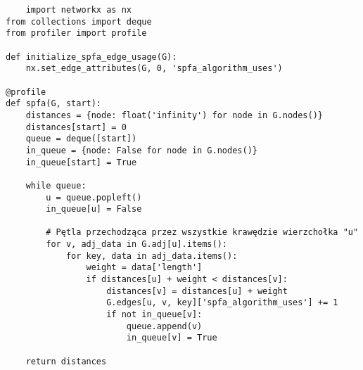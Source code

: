 \documentclass{article}
\begin{document}
\lstset{language=Pascal}          %

\begin{lstlisting}
    import networkx as nx
from collections import deque
from profiler import profile

def initialize_spfa_edge_usage(G):
    nx.set_edge_attributes(G, 0, 'spfa_algorithm_uses')

@profile
def spfa(G, start):
    distances = {node: float('infinity') for node in G.nodes()}
    distances[start] = 0
    queue = deque([start])
    in_queue = {node: False for node in G.nodes()}
    in_queue[start] = True

    while queue:
        u = queue.popleft()
        in_queue[u] = False
        
        # Pętla przechodząca przez wszystkie krawędzie wierzchołka "u"
        for v, adj_data in G.adj[u].items():
            for key, data in adj_data.items():
                weight = data['length']
                if distances[u] + weight < distances[v]:
                    distances[v] = distances[u] + weight
                    G.edges[u, v, key]['spfa_algorithm_uses'] += 1
                    if not in_queue[v]:
                        queue.append(v)
                        in_queue[v] = True

    return distances
    
    
    
\end{lstlisting}
\end{document}

